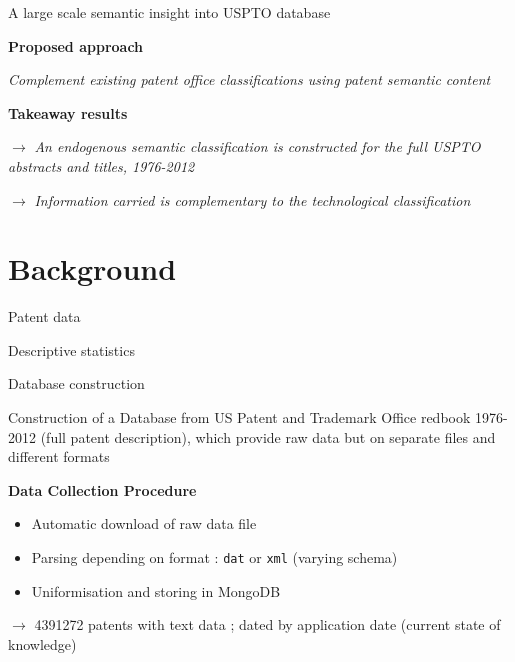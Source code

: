 \documentclass{beamer}
\begin{document}
\begin{frame}{A large scale semantic insight into USPTO database}
    
    
    \textbf{Proposed approach}
    
    \textit{Complement existing patent office classifications using patent semantic content}
    
    \bigskip
    
    \textbf{Takeaway results}
    
    $\rightarrow$ \textit{An endogenous semantic classification is constructed for the full USPTO abstracts and titles, 1976-2012}
    
    \bigskip

    $\rightarrow$ \textit{Information carried is complementary to the technological classification}
    
    
\end{frame}
\section{Background}

\begin{frame}{Patent data}
    
    
\end{frame}
\begin{frame}{Descriptive statistics}
\end{frame}
    
\begin{frame}{Database construction}
    
Construction of a Database from US Patent and Trademark Office redbook 1976-2012 (full patent description), which provide raw data but on separate files and different formats

\bigskip

\textbf{Data Collection Procedure}

\begin{itemize}
\item Automatic download of raw data file
\item Parsing depending on format : \texttt{dat} or \texttt{xml} (varying schema)
\item Uniformisation and storing in MongoDB
\end{itemize}

\bigskip

$\rightarrow$ 4391272 patents with text data ; dated by application date (current state of knowledge)

\end{frame}
\end{document}
